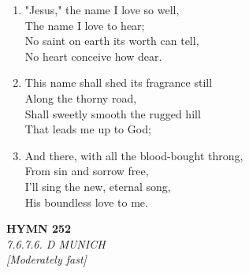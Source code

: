 \documentclass[11pt,a4paper]{article}
\begin{document}
\begin{enumerate}
    \item "Jesus," the name I love so well, \\
            The name I love to hear; \\
        No saint on earth its worth can tell, \\
            No heart conceive how dear.

    \item This name shall shed its fragrance still \\
            Along the thorny road, \\
        Shall sweetly smooth the rugged hill \\
            That leads me up to God;

    \item And there, with all the blood-bought throng, \\
            From sin and sorrow free, \\
        I'll sing the new, eternal song, \\
            His boundless love to me.

\end{enumerate}

\newpage
\begin{center}
    {\Large \textbf{HYMN 252}}
    \\
    \textit{7.6.7.6. D MUNICH}
    \\
    \textit{\small [Moderately fast]}
\end{center}
\vspace{1em}
\end{document}
